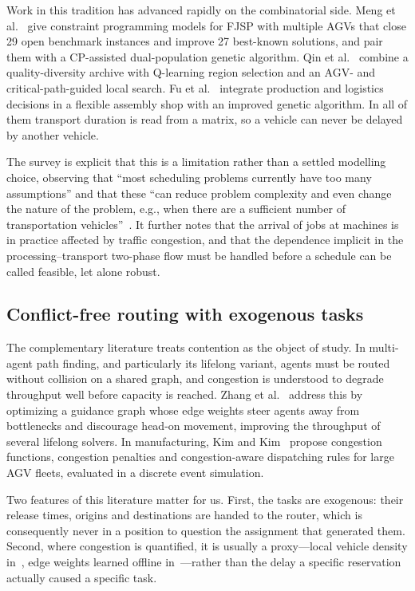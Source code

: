 \documentclass[manuscript,screen,review]{acmart}
\begin{document}
Work in this tradition has advanced rapidly on the combinatorial side. Meng et
al.~\cite{meng2025cp} give constraint programming models for FJSP with multiple
AGVs that close 29 open benchmark instances and improve 27 best-known solutions,
and pair them with a CP-assisted dual-population genetic algorithm. Qin et
al.~\cite{qin2026knowledge} combine a quality-diversity archive with Q-learning
region selection and an AGV- and critical-path-guided local search. Fu et
al.~\cite{fu2025integrated} integrate production and logistics decisions in a
flexible assembly shop with an improved genetic algorithm. In all of them
transport duration is read from a matrix, so a vehicle can never be delayed by
another vehicle.

The survey is explicit that this is a limitation rather than a settled
modelling choice, observing that ``most scheduling problems currently have too
many assumptions'' and that these ``can reduce problem complexity and even change
the nature of the problem, e.g., when there are a sufficient number of
transportation vehicles''~\cite{xin2025review}. It further notes that the
arrival of jobs at machines is in practice affected by traffic congestion, and
that the dependence implicit in the processing--transport two-phase flow must be
handled before a schedule can be called feasible, let alone robust.

\subsection{Conflict-free routing with exogenous tasks}

The complementary literature treats contention as the object of study. In
multi-agent path finding, and particularly its lifelong variant, agents must be
routed without collision on a shared graph, and congestion is understood to
degrade throughput well before capacity is reached. Zhang et
al.~\cite{zhang2024guidance} address this by optimizing a guidance graph whose
edge weights steer agents away from bottlenecks and discourage head-on movement,
improving the throughput of several lifelong solvers. In manufacturing, Kim and
Kim~\cite{kim2026congestion} propose congestion functions, congestion penalties
and congestion-aware dispatching rules for large AGV fleets, evaluated in a
discrete event simulation.

Two features of this literature matter for us. First, the tasks are exogenous:
their release times, origins and destinations are handed to the router, which is
consequently never in a position to question the assignment that generated them.
Second, where congestion is quantified, it is usually a proxy---local vehicle
density in~\cite{kim2026congestion}, edge weights learned offline
in~\cite{zhang2024guidance}---rather than the delay a specific reservation
actually caused a specific task.
\end{document}
